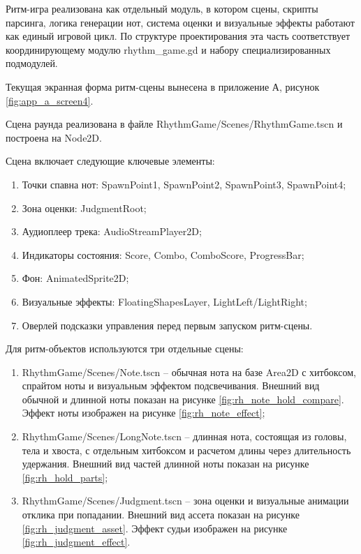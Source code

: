 \documentclass[utf8, russian]{eskdtext}
\numberwithin{equation}{section}
\newcounter{game_cnt}
\begin{document}
Ритм-игра реализована как отдельный модуль, в котором сцены, скрипты парсинга, логика генерации нот, система оценки и визуальные эффекты работают как единый игровой цикл. По структуре проектирования эта часть соответствует координирующему модулю rhythm\_game.gd и набору специализированных подмодулей.

Текущая экранная форма ритм-сцены вынесена в приложение А, рисунок \ref{fig:app_a_screen4}.

Сцена раунда реализована в файле RhythmGame/Scenes/RhythmGame.tscn и построена на Node2D. 

Сцена включает следующие ключевые элементы:

\begin{enumerate}
    \item Точки спавна нот: SpawnPoint1, SpawnPoint2, SpawnPoint3, SpawnPoint4;
    \item Зона оценки: JudgmentRoot;
    \item Аудиоплеер трека: AudioStreamPlayer2D;
    \item Индикаторы состояния: Score, Combo, ComboScore, ProgressBar;
    \item Фон: AnimatedSprite2D;
    \item Визуальные эффекты: FloatingShapesLayer, LightLeft/LightRight;
    \item Оверлей подсказки управления перед первым запуском ритм-сцены.
\end{enumerate}

Для ритм-объектов используются три отдельные сцены:
\begin{enumerate}
    \item RhythmGame/Scenes/Note.tscn -- обычная нота на базе Area2D с хитбоксом, спрайтом ноты и визуальным эффектом подсвечивания. Внешний вид обычной и длинной ноты показан на рисунке \ref{fig:rh_note_hold_compare}. Эффект ноты изображен на рисунке \ref{fig:rh_note_effect};
    \item RhythmGame/Scenes/LongNote.tscn -- длинная нота, состоящая из головы, тела и хвоста, с отдельным хитбоксом и расчетом длины через длительность удержания. Внешний вид частей длинной ноты показан на рисунке \ref{fig:rh_hold_parts};
    \item RhythmGame/Scenes/Judgment.tscn -- зона оценки и визуальные анимации отклика при попадании. Внешний вид ассета показан на рисунке \ref{fig:rh_judgment_asset}. Эффект судьи изображен на рисунке \ref{fig:rh_judgment_effect}.
\end{enumerate}
\end{document}
